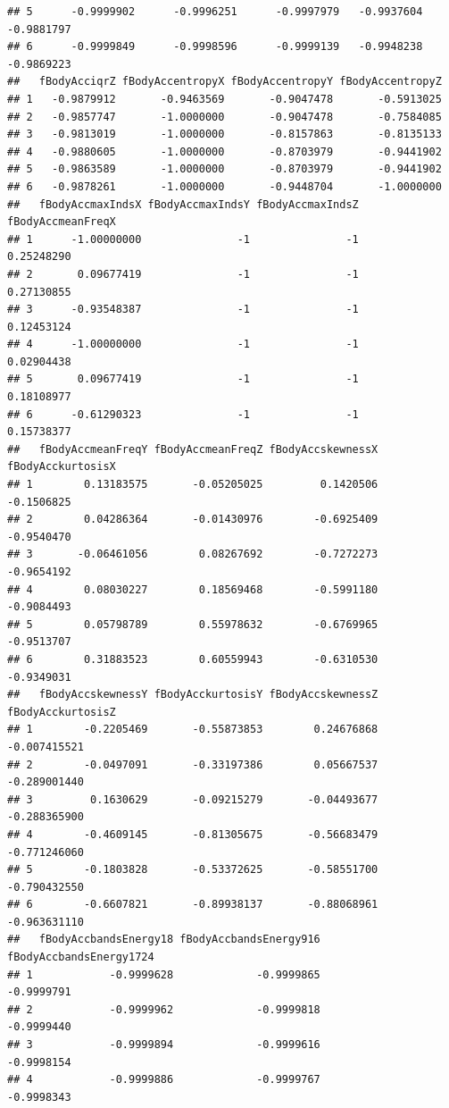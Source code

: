 \documentclass[
]{article}
\begin{document}
\begin{verbatim}
## 5      -0.9999902      -0.9996251      -0.9997979   -0.9937604   -0.9881797
## 6      -0.9999849      -0.9998596      -0.9999139   -0.9948238   -0.9869223
##   fBodyAcciqrZ fBodyAccentropyX fBodyAccentropyY fBodyAccentropyZ
## 1   -0.9879912       -0.9463569       -0.9047478       -0.5913025
## 2   -0.9857747       -1.0000000       -0.9047478       -0.7584085
## 3   -0.9813019       -1.0000000       -0.8157863       -0.8135133
## 4   -0.9880605       -1.0000000       -0.8703979       -0.9441902
## 5   -0.9863589       -1.0000000       -0.8703979       -0.9441902
## 6   -0.9878261       -1.0000000       -0.9448704       -1.0000000
##   fBodyAccmaxIndsX fBodyAccmaxIndsY fBodyAccmaxIndsZ fBodyAccmeanFreqX
## 1      -1.00000000               -1               -1        0.25248290
## 2       0.09677419               -1               -1        0.27130855
## 3      -0.93548387               -1               -1        0.12453124
## 4      -1.00000000               -1               -1        0.02904438
## 5       0.09677419               -1               -1        0.18108977
## 6      -0.61290323               -1               -1        0.15738377
##   fBodyAccmeanFreqY fBodyAccmeanFreqZ fBodyAccskewnessX fBodyAcckurtosisX
## 1        0.13183575       -0.05205025         0.1420506        -0.1506825
## 2        0.04286364       -0.01430976        -0.6925409        -0.9540470
## 3       -0.06461056        0.08267692        -0.7272273        -0.9654192
## 4        0.08030227        0.18569468        -0.5991180        -0.9084493
## 5        0.05798789        0.55978632        -0.6769965        -0.9513707
## 6        0.31883523        0.60559943        -0.6310530        -0.9349031
##   fBodyAccskewnessY fBodyAcckurtosisY fBodyAccskewnessZ fBodyAcckurtosisZ
## 1        -0.2205469       -0.55873853        0.24676868      -0.007415521
## 2        -0.0497091       -0.33197386        0.05667537      -0.289001440
## 3         0.1630629       -0.09215279       -0.04493677      -0.288365900
## 4        -0.4609145       -0.81305675       -0.56683479      -0.771246060
## 5        -0.1803828       -0.53372625       -0.58551700      -0.790432550
## 6        -0.6607821       -0.89938137       -0.88068961      -0.963631110
##   fBodyAccbandsEnergy18 fBodyAccbandsEnergy916 fBodyAccbandsEnergy1724
## 1            -0.9999628             -0.9999865              -0.9999791
## 2            -0.9999962             -0.9999818              -0.9999440
## 3            -0.9999894             -0.9999616              -0.9998154
## 4            -0.9999886             -0.9999767              -0.9998343

\end{verbatim}
\end{document}
